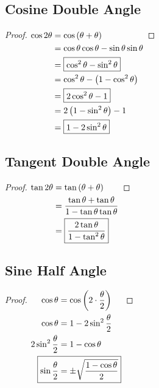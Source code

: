 \documentclass{article}
\begin{document}
\subsection{Cosine Double Angle}
\label{proof:cosdouble}
\begin{proof}
	$\begin{aligned}[t]
		\cos2\theta&=\cos\left(\theta+\theta\right) \\
		&=\cos\theta\cos\theta-\sin\theta\sin\theta \\
		&=\boxed{\cos^2\theta-\sin^2\theta} \\
		&=\cos^2\theta-\left(1-\cos^2\theta\right) \\
		&=\boxed{2\cos^2\theta-1} \\
		&=2\left(1-\sin^2\theta\right)-1 \\
		&=\boxed{1-2\sin^2\theta} \\
	\end{aligned} \\$
\end{proof}

\subsection{Tangent Double Angle}
\label{proof:tandouble}
\begin{proof}
	$\begin{aligned}[t]
		\tan2\theta&=\tan\left(\theta+\theta\right) \\
		&=\frac{\tan\theta+\tan\theta}{1-\tan\theta\tan\theta} \\
		&=\boxed{\frac{2\tan\theta}{1-\tan^2\theta}} \\
	\end{aligned} \\$
\end{proof}

\subsection{Sine Half Angle}
\label{proof:sinhalf}
\begin{proof}
	$\begin{aligned}[t]
		\cos\theta&=\cos\left(2\cdot\frac{\theta}{2}\right) \\
		\cos\theta&=1-2\sin^2\frac{\theta}{2} \\
		2\sin^2\frac{\theta}{2}&=1-\cos\theta \\
		\Aboxed{\sin\frac{\theta}{2}&=\pm\sqrt{\frac{1-\cos\theta}{2}}} \\
	\end{aligned} \\$
\end{proof}
\end{document}
